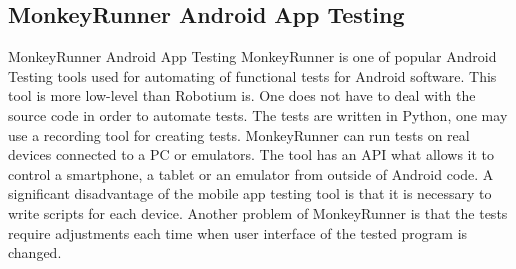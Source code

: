 \subsection{MonkeyRunner Android App Testing}
MonkeyRunner Android App Testing
MonkeyRunner is one of popular Android Testing tools used for automating of functional tests for Android software. This tool is more low-level than Robotium is. One does not have to deal with the source code in order to automate tests. The tests are written in Python, one may use a recording tool for creating tests.
MonkeyRunner can run tests on real devices connected to a PC or emulators. The tool has an API what allows it to control a smartphone, a tablet or an emulator from outside of Android code. A significant disadvantage of the mobile app testing tool is that it is necessary to write scripts for each device. Another problem of MonkeyRunner is that the tests require adjustments each time when user interface of the tested program is changed.